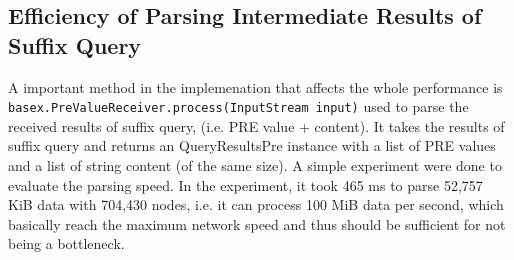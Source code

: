  
%
%


\subsection{Efficiency of Parsing Intermediate Results of Suffix Query}
A important method in the implemenation that affects the whole performance is 
\texttt{basex.PreValueReceiver.process(InputStream input)} used 
to parse the received results of suffix query, (i.e. PRE value + 
content). It takes the results of suffix query and returns an 
QueryResultsPre instance with a list of PRE values and a list of 
string content (of the same size). A simple experiment were done to evaluate 
the parsing speed. In the experiment, it took 465 ms to parse 
52,757 KiB data with 704,430 nodes, i.e. it can process 100 MiB 
data per second, which basically reach the maximum network 
speed and thus should be sufficient for not being a bottleneck.


